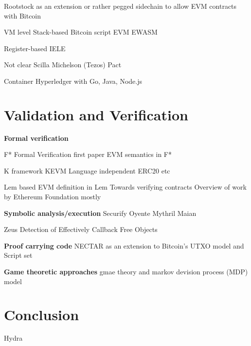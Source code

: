 \documentclass{article}
\begin{document}
Rootstock as an extension or rather pegged sidechain to allow EVM contracts with Bitcoin \cite{Lerner2015}

VM level
Stack-based
Bitcoin script \cite{BitcoinWiki2018Script}
EVM \cite{Wood2014}
EWASM \cite{Wanderer2015,EthereumFoundation2018ewasm}

Register-based
IELE \cite{Kasampalis2018}

Not clear
Scilla \cite{Sergey2018}
Michelson (Tezos) \cite{DynamicLedgerSolutions2017}
Pact \cite{Popejoy2017}

Container
Hyperledger with Go, Java, Node.js \cite{Cachin2016}

\section{Validation and Verification}
\label{verification}
\textbf{Formal verification}

F*
Formal Verification first paper \cite{Bhargavan2016}
EVM semantics in F* \cite{Grishchenko2018}

K framework \cite{Rosu2007} 
KEVM \cite{Hildenbrandt2017}
Language independent \cite{Chen2018}
ERC20 etc \cite{Park2018}

Lem based \cite{Mulligan2014}
EVM definition in Lem \cite{Hirai2017}
Towards verifying contracts \cite{Amani2018}
Overview of work by Ethereum Foundation mostly \citeauthor{Hirai2018} \cite{Hirai2018}



\textbf{Symbolic analysis/execution}
Securify \cite{Tsankov2017}
Oyente \cite{Luu2016}
Mythril
Maian

Zeus \cite{Kalra2018}
Detection of Effectively Callback Free Objects \cite{Grossman2017}



\textbf{Proof carrying code}
NECTAR as an extension to Bitcoin's UTXO model and Script set \cite{Covaci2018}

\textbf{Game theoretic approaches}
gmae theory and markov devision process (MDP) model \cite{Bigi2015}



\section{Conclusion}
\label{conclusion}
Hydra \cite{Breidenbach2018}


\printbibliography
\end{document}
